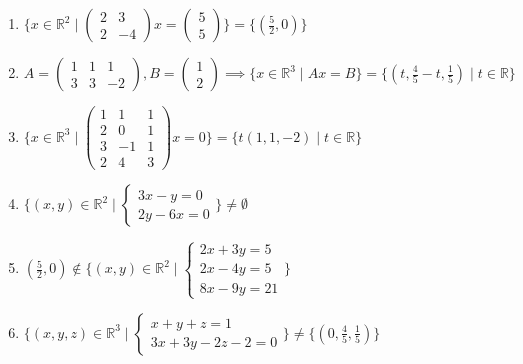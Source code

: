 \documentclass[11pt,a4paper]{article}
\begin{document}
\begin{enumerate}
\item $\displaystyle \{x \in \mathbb{R}^{2} \mid \begin{pmatrix} 2 & 3 \\ 2 & -4 \end{pmatrix} x = \begin{pmatrix} 5 \\ 5 \end{pmatrix}\} = \{(\frac{5}{2}, 0)\}$
\item $\displaystyle A = \begin{pmatrix} 1 & 1 & 1 \\ 3 & 3 & -2 \end{pmatrix}, B = \begin{pmatrix} 1 \\ 2 \end{pmatrix} \implies \{x \in \mathbb{R}^{3} \mid A x = B\} = \{(t, \frac{4}{5} - t, \frac{1}{5}) \mid t \in \mathbb{R}\}$
\item $\displaystyle \{x \in \mathbb{R}^{3} \mid \begin{pmatrix} 1 & 1 & 1 \\ 2 & 0 & 1 \\ 3 & -1 & 1 \\ 2 & 4 & 3 \end{pmatrix} x = 0\} = \{t (1, 1, -2) \mid t \in \mathbb{R}\}$
\item $\displaystyle \{(x, y) \in \mathbb{R}^{2} \mid \begin{cases} 3x - y = 0 \\ 2y - 6x = 0 \end{cases}\} \neq \emptyset$
\item $\displaystyle (\frac{5}{2}, 0) \notin \{(x, y) \in \mathbb{R}^{2} \mid \begin{cases} 2x + 3y = 5 \\ 2x - 4y = 5 \\ 8x - 9y = 21 \end{cases}\}$
\item $\displaystyle \{(x, y, z) \in \mathbb{R}^{3} \mid \begin{cases} x + y + z = 1 \\ 3x + 3y - 2z - 2 = 0 \end{cases}\} \neq \{(0, \frac{4}{5}, \frac{1}{5})\}$
\end{enumerate}
\end{document}
